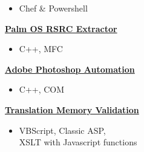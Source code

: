 {\begin{itemize}[noitemsep,topsep=-10pt]
  \item Chef \& Powershell \\
\end{itemize}
\textbf{\href{http://johnpaulnewman.com/projects/palm-os-rsrc-extractor/}{Palm OS RSRC Extractor}}
\begin{itemize}[noitemsep,topsep=-10pt]
  \item C++, MFC \\
\end{itemize}
\textbf{\href{http://johnpaulnewman.com/projects/adobe-photoshop-automation/}{Adobe Photoshop Automation}}
\begin{itemize}[noitemsep,topsep=-10pt]
  \item C++, COM \\
\end{itemize}
\textbf{\href{http://johnpaulnewman.com/projects/translation-memory-validation/}{Translation Memory Validation}}
\begin{itemize}[noitemsep,topsep=-10pt]
  \item VBScript, Classic ASP, \\
XSLT with Javascript functions \\
\end{itemize}
}
